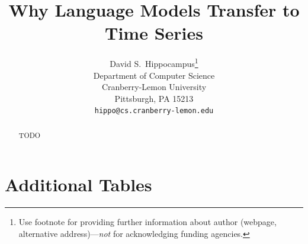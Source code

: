 \documentclass{article}
\title{Why Language Models Transfer to Time Series}
\author{%
  David S.~Hippocampus\thanks{Use footnote for providing further information
    about author (webpage, alternative address)---\emph{not} for acknowledging
    funding agencies.} \\
  Department of Computer Science\\
  Cranberry-Lemon University\\
  Pittsburgh, PA 15213 \\
  \texttt{hippo@cs.cranberry-lemon.edu} \\
}
\begin{document}
\maketitle


\begin{abstract}
TODO
\end{abstract}


 













\small




\newpage
\appendix

\section{Additional Tables}
\end{document}
